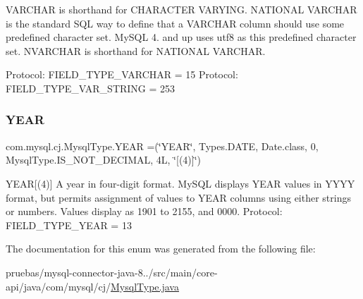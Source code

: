 V\+A\+R\+C\+H\+AR is shorthand for C\+H\+A\+R\+A\+C\+T\+ER V\+A\+R\+Y\+I\+NG. N\+A\+T\+I\+O\+N\+AL V\+A\+R\+C\+H\+AR is the standard S\+QL way to define that a V\+A\+R\+C\+H\+AR column should use some predefined character set. My\+S\+QL 4. and up uses utf8 as this predefined character set. N\+V\+A\+R\+C\+H\+AR is shorthand for N\+A\+T\+I\+O\+N\+AL V\+A\+R\+C\+H\+AR.

Protocol\+: F\+I\+E\+L\+D\+\_\+\+T\+Y\+P\+E\+\_\+\+V\+A\+R\+C\+H\+AR = 15 Protocol\+: F\+I\+E\+L\+D\+\_\+\+T\+Y\+P\+E\+\_\+\+V\+A\+R\+\_\+\+S\+T\+R\+I\+NG = 253 \mbox{\label{enumcom_1_1mysql_1_1cj_1_1_mysql_type_a58de6bd3431bd81f859926ed489f19c1}} 
\subsubsection{\texorpdfstring{Y\+E\+AR}{YEAR}}
{\footnotesize\ttfamily com.\+mysql.\+cj.\+Mysql\+Type.\+Y\+E\+AR =(\char`\"{}Y\+E\+AR\char`\"{}, Types.\+D\+A\+TE, Date.\+class, 0, Mysql\+Type.\+I\+S\+\_\+\+N\+O\+T\+\_\+\+D\+E\+C\+I\+M\+AL, 4\+L, \char`\"{}\mbox{[}(4)\mbox{]}\char`\"{})}

Y\+E\+AR\mbox{[}(4)\mbox{]} A year in four-\/digit format. My\+S\+QL displays Y\+E\+AR values in Y\+Y\+YY format, but permits assignment of values to Y\+E\+AR columns using either strings or numbers. Values display as 1901 to 2155, and 0000. Protocol\+: F\+I\+E\+L\+D\+\_\+\+T\+Y\+P\+E\+\_\+\+Y\+E\+AR = 13 

The documentation for this enum was generated from the following file\+:\begin{DoxyCompactItemize}
\item 
pruebas/mysql-\/connector-\/java-\/8../src/main/core-\/api/java/com/mysql/cj/\mbox{\hyperlink{_mysql_type_8java}{Mysql\+Type.\+java}}\end{DoxyCompactItemize}

